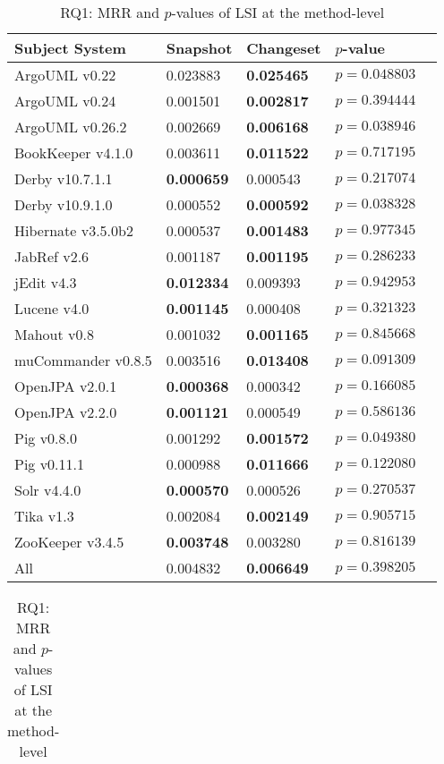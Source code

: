 \begin{table}[t]
\renewcommand{\arraystretch}{1.3}
\footnotesize
\centering
\caption{RQ1: MRR and $p$-values of LSI at the class-level}
\begin{tabular}{l|ll|ll}
\toprule
Subject System & Snapshot & Changeset & $p$-value  \\
\midrule
ArgoUML v0.22 & 0.023883 & {\bf 0.025465 } & $p = 0.048803$ \\
ArgoUML v0.24 & 0.001501 & {\bf 0.002817 } & $p = 0.394444$ \\
ArgoUML v0.26.2 & 0.002669 & {\bf 0.006168 } & $p = 0.038946$ \\
BookKeeper v4.1.0 & 0.003611 & {\bf 0.011522 } & $p = 0.717195$ \\
Derby v10.7.1.1 & {\bf 0.000659 } & 0.000543 & $p = 0.217074$ \\
Derby v10.9.1.0 & 0.000552 & {\bf 0.000592 } & $p = 0.038328$ \\
Hibernate v3.5.0b2 & 0.000537 & {\bf 0.001483 } & $p = 0.977345$ \\
JabRef v2.6 & 0.001187 & {\bf 0.001195 } & $p = 0.286233$ \\
jEdit v4.3 & {\bf 0.012334 } & 0.009393 & $p = 0.942953$ \\
Lucene v4.0 & {\bf 0.001145 } & 0.000408 & $p = 0.321323$ \\
Mahout v0.8 & 0.001032 & {\bf 0.001165 } & $p = 0.845668$ \\
muCommander v0.8.5 & 0.003516 & {\bf 0.013408 } & $p = 0.091309$ \\
OpenJPA v2.0.1 & {\bf 0.000368 } & 0.000342 & $p = 0.166085$ \\
OpenJPA v2.2.0 & {\bf 0.001121 } & 0.000549 & $p = 0.586136$ \\
Pig v0.8.0 & 0.001292 & {\bf 0.001572 } & $p = 0.049380$ \\
Pig v0.11.1 & 0.000988 & {\bf 0.011666 } & $p = 0.122080$ \\
Solr v4.4.0 & {\bf 0.000570 } & 0.000526 & $p = 0.270537$ \\
Tika v1.3 & 0.002084 & {\bf 0.002149 } & $p = 0.905715$ \\
ZooKeeper v3.4.5 & {\bf 0.003748 } & 0.003280 & $p = 0.816139$ \\
\midrule
All & 0.004832 & {\bf 0.006649 } & $p = 0.398205$ \\
\bottomrule
\end{tabular}
\label{table:rq1:class:lsi}
\caption{RQ1: MRR and $p$-values of LSI at the method-level}
\begin{tabular}{l|ll|ll}

\end{tabular}
\end{table}
